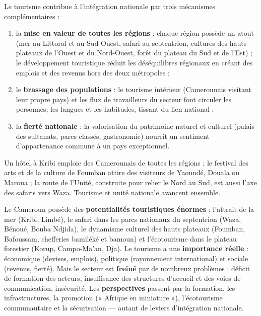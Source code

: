 \documentclass[11pt]{article}
\newcounter{popsec}
\newcounter{popsub}
\newcommand{\courssub}[1]{%
  \stepcounter{popsub}%
  \par\vspace{9pt}\noindent{\popxbold\fontsize{11.5}{13}\selectfont\color{popink}{\color{poporange}\thepopsec.\thepopsub}\hspace{6pt}#1}\par\nopagebreak\vspace{4pt}
}
\begin{document}
\begin{propriete}
Le tourisme contribue à l'intégration nationale par trois mécanismes complémentaires :
\begin{enumerate}
\item la \textbf{mise en valeur de toutes les régions} : chaque région possède un atout (mer au Littoral et au Sud-Ouest, safari au septentrion, cultures des hauts plateaux de l'Ouest et du Nord-Ouest, forêt du plateau du Sud et de l'Est) ; le développement touristique réduit les déséquilibres régionaux en créant des emplois et des revenus hors des deux métropoles ;
\item le \textbf{brassage des populations} : le tourisme intérieur (Camerounais visitant leur propre pays) et les flux de travailleurs du secteur font circuler les personnes, les langues et les habitudes, tissant du lien national ;
\item la \textbf{fierté nationale} : la valorisation du patrimoine naturel et culturel (palais des sultanats, parcs classés, gastronomie) nourrit un sentiment d'appartenance commune à un pays exceptionnel.
\end{enumerate}
\end{propriete}

\begin{exemplebox}
Un hôtel à Kribi emploie des Camerounais de toutes les régions ; le festival des arts et de la culture de Foumban attire des visiteurs de Yaoundé, Douala ou Maroua ; la route de l'Unité, construite pour relier le Nord au Sud, est aussi l'axe des safaris vers Waza. Tourisme et unité nationale avancent ensemble.
\end{exemplebox}

\courssub{Synthèse de la leçon et bilan des savoir-faire}

\begin{aretenir}
Le Cameroun possède des \textbf{potentialités touristiques énormes} : l'attrait de la mer (Kribi, Limbé), le safari dans les parcs nationaux du septentrion (Waza, Bénoué, Bouba Ndjida), le dynamisme culturel des hauts plateaux (Foumban, Bafoussam, chefferies bamiléké et bamoun) et l'écotourisme dans le plateau forestier (Korup, Campo-Ma'an, Dja). Le tourisme a une \textbf{importance réelle} : économique (devises, emplois), politique (rayonnement international) et sociale (revenus, fierté). Mais le secteur est \textbf{freiné} par de nombreux problèmes : déficit de formation des acteurs, insuffisance des structures d'accueil et des voies de communication, insécurité. Les \textbf{perspectives} passent par la formation, les infrastructures, la promotion (« Afrique en miniature »), l'écotourisme communautaire et la sécurisation — autant de leviers d'intégration nationale.
\end{aretenir}
\end{document}

